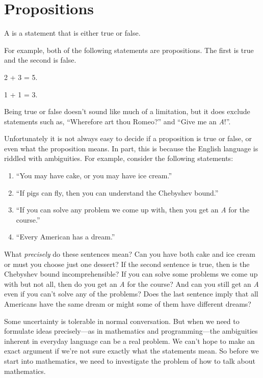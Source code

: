 \chapter{Propositions}\label{prop_chap}

\begin{definition*}
A  is a statement that is either true or false.
\end{definition*}

For example, both of the following statements are propositions.  The
first is true and the second is false.
\begin{proposition}
2 + 3 = 5.
\end{proposition}
\begin{proposition}
1 + 1 = 3.
\end{proposition}
Being true or false doesn't sound like much of a limitation, but it
does exclude statements such as, ``Wherefore art thou Romeo?'' and
``Give me an \emph{A}!''.

Unfortunately it is not always easy to decide if a proposition is true
or false, or even what the proposition means.  In part, this is
because the English language is riddled with ambiguities.  For
example, consider the following statements:
%
\begin{enumerate}
\item ``You may have cake, or you may have ice cream.''
\item ``If pigs can fly, then you can understand the Chebyshev bound.''
\item ``If you can solve any problem we come up with, then you get an
  \emph{A} for the course.''
\item ``Every American has a dream.''
\end{enumerate}
%
What \emph{precisely} do these sentences mean?  Can you have both cake
and ice cream or must you choose just one dessert?  If the second
sentence is true, then is the Chebyshev bound incomprehensible?  If
you can solve some problems we come up with but not all, then do you
get an \emph{A} for the course?  And can you still get an \emph{A}
even if you can't solve any of the problems?  Does the last sentence
imply that all Americans have the same dream or might some of them
have different dreams?

Some uncertainty is tolerable in normal conversation.  But when we need to
formulate ideas precisely---as in mathematics and programming---the
ambiguities inherent in everyday language can be a real problem.  We can't
hope to make an exact argument if we're not sure exactly what the
statements mean.  So before we start into mathematics, we need to
investigate the problem of how to talk about mathematics.

